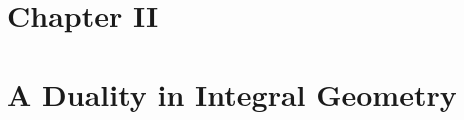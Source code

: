 \documentclass[14pt]{extarticle}
\begin{document}
\begin{outline}
	\section*{Chapter II}
	\section*{A Duality in Integral Geometry}
	\end{outline}
\end{document}
